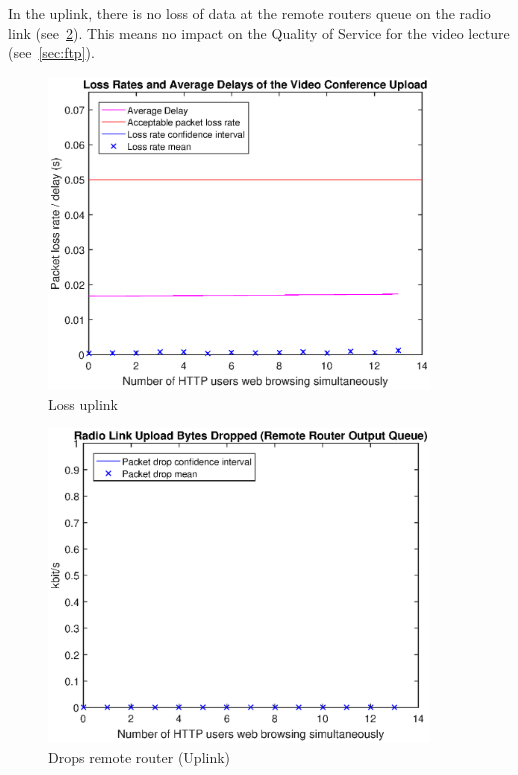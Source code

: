 \documentclass[a4paper,10pt]{book}\usepackage{graphicx}
\begin{document}
In the uplink, there is no loss of data at the remote routers queue on the radio link (see~\ref{fig:remoteRdrops}).
This means no impact on the Quality of Service for the video lecture (see~\ref{sec:ftp}).
\begin{figure}[!ht]
  \begin{center}
  \includegraphics[width=0.9\textwidth]{off_loss_conf_upload.eps}
    \caption{Loss uplink}
     \label{fig:losslecup}
     \end{center}
\end{figure}

\begin{figure}[!ht]
  \begin{center}
    \includegraphics[width=0.9\textwidth]{on_remote_router_drops.eps}
    \caption{Drops remote router (Uplink)}
     \label{fig:remoteRdrops}
     \end{center}
\end{figure}
\end{document}
